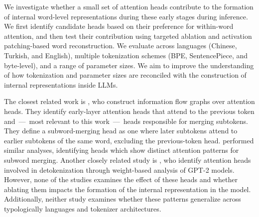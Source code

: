 \documentclass[11pt]{article}
\begin{document}

We investigate whether a small set of attention heads contribute to the formation of internal word-level representations during these early stages during inference. We first identify candidate heads based on their preference for within-word attention, and then test their contribution using targeted ablation and activation patching-based word reconstruction. We evaluate across languages (Chinese, Turkish, and English), multiple tokenization schemes (BPE, SentencePiece, and byte-level), and a range of parameter sizes. We aim to improve the understanding of how tokenization and parameter sizes are reconciled with the construction of internal representations inside LLMs.

The closest related work is \citet{ferrando2024}, who construct information flow graphs over attention heads. They identify early-layer attention heads that attend to the previous token and~---~most relevant to this work~---~heads responsible for merging subtokens. They define a subword-merging head as one where later subtokens attend to earlier subtokens of the same word, excluding the previous-token head. \citet{lad2024} performed similar analyses, identifying heads which show distinct attention patterns for subword merging. Another closely related study is \citet{kamoda2025}, who identify attention heads involved in detokenization through weight-based analysis of GPT-2 models. However, none of the studies examines the effect of these heads and whether ablating them impacts the formation of the internal representation in the model. Additionally, neither study examines whether these patterns generalize across typologically languages and tokenizer architectures.

\end{document}
